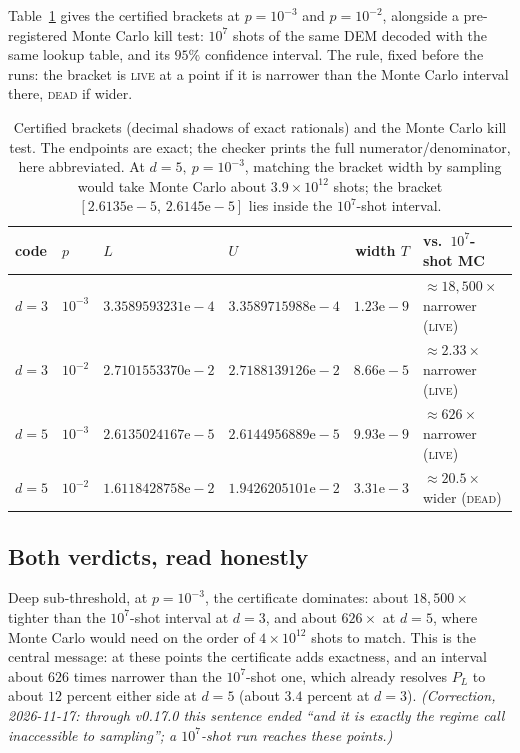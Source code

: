 \documentclass[11pt]{amsart}
\newcommand{\PL}{P_{L}}
\theoremstyle{plain}
\theoremstyle{definition}
\theoremstyle{remark}
\begin{document}
Table~\ref{tab:brackets} gives the certified brackets at $p=10^{-3}$ and
$p=10^{-2}$, alongside a pre-registered Monte Carlo kill test: $10^{7}$ shots
of the same DEM decoded with the same lookup table, and its $95\%$ confidence
interval. The rule, fixed before the runs: the bracket is \textsc{live} at a
point if it is narrower than the Monte Carlo interval there, \textsc{dead} if
wider.

\begin{table}[ht]
\begin{center}
\begin{tabular}{llll r l}
\toprule
code & $p$ & $L$ & $U$ & width $T$ & vs.\ $10^7$-shot MC \\
\midrule
$d=3$ & $10^{-3}$ & $3.3589593231\text{e}{-}4$ & $3.3589715988\text{e}{-}4$
   & $1.23\text{e}{-}9$  & $\approx 18{,}500\times$ narrower (\textsc{live}) \\
$d=3$ & $10^{-2}$ & $2.7101553370\text{e}{-}2$ & $2.7188139126\text{e}{-}2$
   & $8.66\text{e}{-}5$  & $\approx 2.33\times$ narrower (\textsc{live}) \\
$d=5$ & $10^{-3}$ & $2.6135024167\text{e}{-}5$ & $2.6144956889\text{e}{-}5$
   & $9.93\text{e}{-}9$  & $\approx 626\times$ narrower (\textsc{live}) \\
$d=5$ & $10^{-2}$ & $1.6118428758\text{e}{-}2$ & $1.9426205101\text{e}{-}2$
   & $3.31\text{e}{-}3$  & $\approx 20.5\times$ wider (\textsc{dead}) \\
\bottomrule
\end{tabular}
\end{center}
\caption{Certified brackets (decimal shadows of exact rationals) and the Monte
Carlo kill test. The endpoints are exact; the checker prints the full
numerator/denominator, here abbreviated. At $d=5,\ p=10^{-3}$, matching the
bracket width by sampling would take Monte Carlo about $3.9\times10^{12}$ shots;
the bracket $[2.6135\text{e}{-}5,\,2.6145\text{e}{-}5]$ lies inside the
$10^7$-shot interval.}
\label{tab:brackets}
\end{table}

\subsection{Both verdicts, read honestly} Deep sub-threshold, at $p=10^{-3}$,
the certificate dominates: about $18{,}500\times$ tighter than the $10^7$-shot
interval at $d=3$, and about $626\times$ at $d=5$, where Monte Carlo would need
on the order of $4\times10^{12}$ shots to match. This is the central message:
at these points the certificate adds exactness, and an interval about $626$
times narrower than the $10^7$-shot one, which already resolves $\PL$ to about
$12$ percent either side at $d=5$ (about $3.4$ percent at $d=3$).
\emph{(Correction, 2026-11-17: through v0.17.0 this sentence ended ``and it
is exactly the regime \cite{MWB} call inaccessible to sampling''; a
$10^7$-shot run reaches these points.)}
\end{document}
